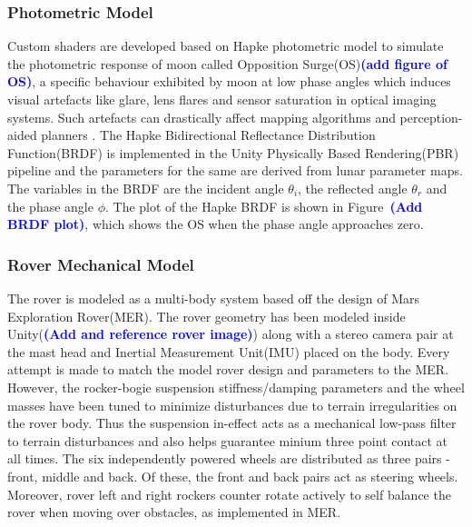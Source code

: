 \documentclass[a4paper, 10pt, conference]{ieeeconf}      %
\newcommand\coltxt[2]{\textbf{\textcolor{#1}{(#2)}}}
\newcommand\msm[1]{\coltxt{blue}{#1}}
\begin{document}
\subsubsection{Photometric Model}
Custom shaders are developed based on Hapke photometric model\cite{hapke2012theory} to simulate the photometric response of moon called Opposition Surge(OS)\cite{gehrels1964wavelength}\msm{add figure of OS}, a specific behaviour exhibited by moon at low phase angles which induces visual artefacts like glare, lens flares and sensor saturation in optical imaging systems. Such artefacts can drastically affect mapping algorithms and perception-aided planners \cite{otsu2017look}. The Hapke Bidirectional Reflectance Distribution Function(BRDF) is implemented in the Unity Physically Based Rendering(PBR) pipeline\cite{pranckevivcius2014physically} and the parameters for the same are derived from lunar parameter maps\cite{sato2014resolved}. The variables in the BRDF are the incident angle $\theta_i$, the reflected angle $\theta_r$ and the phase angle $\phi$. The plot of the Hapke BRDF is shown in Figure~\msm{Add BRDF plot}, which shows the OS when the phase angle approaches zero.
\subsubsection{Rover Mechanical Model}
The rover is modeled as a multi-body system based off the design of Mars Exploration Rover(MER). The rover geometry has been modeled inside Unity(\msm{Add and reference rover image}) along with a stereo camera pair at the mast head and Inertial Measurement Unit(IMU) placed on the body. Every attempt is made to match the model rover design and parameters to the MER\cite{crisp2003mars}. However, the rocker-bogie suspension stiffness/damping parameters and the wheel masses have been tuned to minimize disturbances due to terrain irregularities on the rover body. Thus the suspension in-effect acts as a mechanical low-pass filter to terrain disturbances and also helps guarantee minium three point contact at all times. The six independently powered wheels are distributed as three pairs - front, middle and back. Of these, the front and back pairs act as steering wheels. Moreover, rover left and right rockers counter rotate actively to self balance the rover when moving over obstacles, as implemented in MER.
\end{document}
